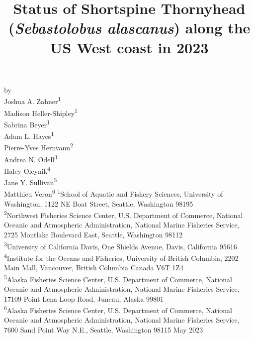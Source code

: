 \documentclass[11pt,
  english,
  letterpaper,
]{article}
\date{}
\newcommand{\trTitle}{Status of Shortspine Thornyhead (\emph{Sebastolobus alascanus}) along the US West coast in 2023}
\newcommand{\trYear}{2023}
\newcommand{\trMonth}{May}
\begin{document}

\renewcommand*{\thefootnote}{\fnsymbol{footnote}}

\small
\thispagestyle{empty}
\noindent
\begin{center}
\title{Status of Shortspine Thornyhead (\emph{Sebastolobus alascanus}) along the US West coast in 2023}
\vspace{1.5cm}
{\Large\textbf{}}
\vfill
by\\
Joshua A. Zahner\textsuperscript{1}\\
Madison Heller-Shipley\textsuperscript{1}\\
Sabrina Beyer\textsuperscript{1}\\
Adam L. Hayes\textsuperscript{1}\\
Pierre-Yves Hernvann\textsuperscript{2}\\
Andrea N. Odell\textsuperscript{3}\\
Haley Oleynik\textsuperscript{4}\\
Jane Y. Sullivan\textsuperscript{5}\\
Matthieu Veron\textsuperscript{6}\vfill
\textsuperscript{1}School of Aquatic and Fishery Sciences, University of Washington, 1122 NE Boat Street, Seattle, Washington 98195\\
\textsuperscript{2}Northwest Fisheries Science Center, U.S. Department of Commerce, National Oceanic and Atmospheric Administration, National Marine Fisheries Service, 2725 Montlake Boulevard East, Seattle, Washington 98112\\
\textsuperscript{3}University of California Davis, One Shields Avenue, Davis, California 95616\\
\textsuperscript{4}Institute for the Oceans and Fisheries, University of British Columbia, 2202 Main Mall, Vancouver, British Columbia Canada V6T 1Z4\\
\textsuperscript{5}Alaska Fisheries Science Center, U.S. Department of Commerce, National Oceanic and Atmospheric Administration, National Marine Fisheries Service, 17109 Point Lena Loop Road, Juneau, Alaska 99801\\
\textsuperscript{6}Alaska Fisheries Science Center, U.S. Department of Commerce, National Oceanic and Atmospheric Administration, National Marine Fisheries Service, 7600 Sand Point Way N.E., Seattle, Washington 98115\vfill
\trMonth{} \trYear{}
\end{center}
\clearpage
\end{document}
